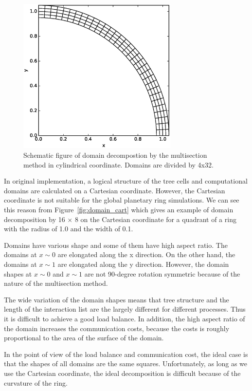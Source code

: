 \documentclass[oribibl]{llncs}
\begin{document}
\begin{figure}
  \centering
    \includegraphics[width=8cm,clip]{./fig/domain_cyl.eps}
  \caption{Schematic figure of domain decompostion by the multisection
    method in cylindrical coordinate. Domains are divided by 4x32.}
  \label{fig:domain_cyl}
\end{figure}

In original implementation, a logical structure of the tree cells and
computational domains are calculated on a Cartesian
coordinate. However, the Cartesian coordinate is not suitable for the
global planetary ring simulations. We can see this reason from
Figure~\ref{fig:domain_cart} which gives an example of domain
decomposition by 16 $\times$ 8 on the Cartesian coordinate for a
quadrant of a ring with the radius of 1.0 and the width of 0.1.

Domains have various shape and some of them have high aspect ratio.
The domains at $x \sim 0$ are elongated along the x direction. On the
other hand, the domains at $x \sim 1$ are elongated along the y
direction. However, the domain shapes at $x \sim 0$ and $x \sim 1$ are
not 90-degree rotation symmetric because of the nature of the
multisection method.

The wide variation of the domain shapes means that tree structure and
the length of the interaction list are the largely different for
different processes. Thus it is difficult to achieve a good load
balance. In addition, the high aspect ratio of the domain increases
the communication costs, because the costs is roughly proportional to
the area of the surface of the domain.

In the point of view of the load balance and communication cost, the
ideal case is that the shapes of all domains are the same
squares. Unfortunately, as long as we use the Cartesian coordinate,
the ideal decomposition is difficult because of the curvature of the
ring.
\end{document}
